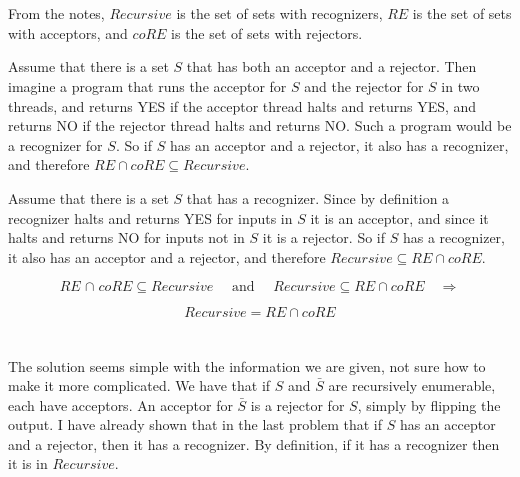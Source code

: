 \documentclass{article}
\begin{document}
\section{}
From the notes, $Recursive$ is the set of sets with recognizers,
$RE$ is the set of sets with acceptors, and $coRE$ is
the set of sets with rejectors.

\vspace{1em}

Assume that there is a set $S$ that has both an acceptor and a rejector. Then
imagine a program that runs the acceptor for $S$ and the rejector for $S$ in
two threads, and returns YES if the acceptor thread halts and returns YES, and
returns NO if the rejector thread halts and returns NO. Such a program would be 
a
recognizer for $S$. So if $S$ has an acceptor and a rejector, it also has a
recognizer, and therefore $RE \cap coRE \subseteq Recursive$.

\vspace{1em}

Assume that there is a set $S$ that has a recognizer. Since 
by definition a recognizer halts
and returns YES for inputs in $S$ it is an acceptor, and since it halts and
returns NO for inputs not in $S$ it is a rejector. So if $S$ has a recognizer,
it also has an acceptor and a rejector, and therefore
$Recursive \subseteq RE \cap coRE$.

\[
RE \hspace{1pt} \cap \hspace{1pt} coRE \subseteq Recursive \hspace{1em}
\text{ and } \hspace{1em}
Recursive \subseteq RE \cap coRE \hspace{1em} \Longrightarrow 
\]

\[
Recursive = RE \cap coRE
\]

\section{}
The solution seems simple with the information we are given, not sure how to
make it more complicated. We have that if $S$ and $\bar S$ are recursively
enumerable, each have acceptors. An acceptor for $\bar S$ is a rejector for
$S$, simply by flipping the output. I have already shown that in the last 
problem that if $S$ has an acceptor and a rejector, then it has a recognizer.
By definition, if it has a recognizer then it is in $Recursive$.
\end{document}
